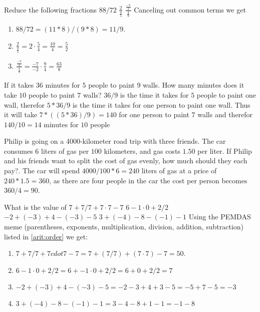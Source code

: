 \begin{ExerciseList}

\Exercise Reduce the following fractions
\Question $88/72$
\Question $\frac{2}{\frac{4}{5}}$
\Question $\frac{\frac{-7}{2}}{\frac{4}{9}}$
\Answer Canceling out common terms we get
\begin{enumerate}
\item\myindent $88/72 = (11*8)/(9*8) = 11/9$.
\item\myindent $\frac{2}{\frac{4}{5}} = 2 \cdot \frac{5}{4} = \frac{10}{4} = \frac{5}{2}$
\item\myindent $\frac{\frac{-7}{2}}{\frac{4}{9}} = \frac{-7}{-2} \cdot \frac{9}{4} = \frac{63}{8}$
\end{enumerate}

\Exercise If it takes 36 minutes for $5$ people to paint $9$ walls. How 
many minutes does it take $10$ people to paint $7$ walls?
\Answer $36/9$ is the time it takes for $5$ people to paint one wall,
therefor $5 * 36/9$ is the time it takes for one person to paint one wall.
Thus it will take $7 * ((5 * 36)/9) = 140$ for one person to paint $7$
walls and therefor $140/10 = 14$ minutes for $10$ people

\Exercise Philip is going on a 4000-kilometer road trip with three friends. 
The car consumes $6$ liters of gas per $100$ kilometers, and gas costs 
$1.50$ per liter. If Philip and his friends want to split the cost of gas 
evenly, how much should they each pay?.
\Answer The car will spend $4000/100 * 6 = 240$ liters of gas at a price of
$240 * 1.5 = 360$, as there are four people in the car the cost per person
becomes $360/4 = 90$.

\Exercise What is the value of
\Question $7 + 7/7 + 7 \cdot 7 - 7$
\Question $6 -1 \cdot 0 + 2/2$
\Question $-2 + (-3) + 4 - (-3) - 5$
\Question $3 + (-4) - 8 - (-1) - 1$
\Answer Using the PEMDAS meme (parentheses, exponents, multiplication, 
division, addition, subtraction) listed in \ref{arit:order} we get: 
\begin{enumerate}
 \item\myindent $7 + 7/7 + 7 cdot 7 - 7 = 7 + (7/7) + (7 \cdot 7) - 7 = 50$. 
 \item\myindent $6 - 1 \cdot 0 + 2/2 = 6 + -1 \cdot 0 + 2/2 = 6 + 0 + 2/2 = 7$
 \item\myindent $-2 + (-3) + 4 - (-3) - 5 = -2 - 3 + 4 + 3 - 5 = -5 + 7 - 5 = -3$
 \item\myindent $3 + (-4) - 8 - (-1) - 1 = 3 - 4 - 8 + 1 - 1 = -1 - 8 $
\end{enumerate} 


\end{ExerciseList}
